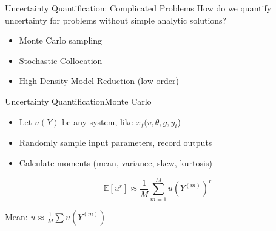 \documentclass{beamer}
\newcommand{\expv}[1]{\ensuremath{\mathbb{E}[ #1]}}
\begin{document}
\begin{frame}{Uncertainty Quantification: Complicated Problems}\vspace{-20pt}
How do we quantify uncertainty for problems without simple analytic solutions?\vspace{15pt}
\begin{itemize}
\item Monte Carlo sampling
\item Stochastic Collocation
\item High Density Model Reduction (low-order)
\end{itemize}
\end{frame}

\begin{frame}{Uncertainty Quantification}{Monte Carlo}\vspace{-30pt}
\begin{itemize}
\item Let $u(Y)$ be any system, like $x_f(v,\theta,g,y_i$)
\item Randomly sample input parameters, record outputs
\item Calculate moments (mean, variance, skew, kurtosis)
\end{itemize}
\[\expv{u^r}\approx\frac{1}{M}\sum_{m=1}^M u\left(Y^{(m)}\right)^r\]%
\centerline{Mean: $\bar u\approx\frac{1}{M}\sum u\left(Y^{(m)}\right)$}
\end{frame}
\end{document}
